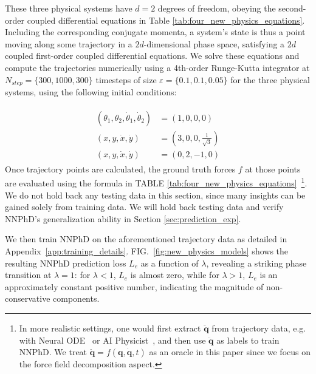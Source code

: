 \documentclass[aps,pre,reprint,superscriptaddress,nofootinbib,amsmath,amssymb]{revtex4-2}
\newcommand{\mat}[1]{\mathbf{#1}}
\newcommand{\q}{\mat{q}}
\newcommand{\qd}{\dot{\mat{q}}}
\newcommand{\qdd}{\ddot{\mat{q}}}
\begin{document}
These three physical systems have $d=2$ degrees of freedom, obeying the second-order coupled differential equations 
in Table \ref{tab:four_new_physics_equations}.
Including the corresponding conjugate momenta, a system's state is thus a point moving along some
trajectory in a $2d$-dimensional phase space, satisfying a $2d$ coupled first-order coupled differential equations. We solve these equations and compute the trajectories numerically using 
a 4th-order Runge-Kutta integrator at $N_{step}=\{300,1000,300%
\}$ timesteps of size $\varepsilon=\{0.1,0.1,0.05%
\}$ for the three physical systems, using the following initial conditions:

\begin{eqnarray}
\begin{aligned}
    (\theta_1,\theta_2,\dot{\theta}_1, \dot{\theta}_2)&=(1,0,0,0)\\
    (x,y,\dot{x},\dot{y})&=(3,0,0,\frac{1}{\sqrt{3}})\\
    (x,y,\dot{x},\dot{y})&=(0,2,-1,0)
\end{aligned}
\end{eqnarray}
Once trajectory points are calculated, the ground truth forces $f$ at those points are evaluated using the formula in TABLE \ref{tab:four_new_physics_equations}~\footnote{In more realistic settings, one would first extract $\qdd$ from trajectory data, e.g. with Neural ODE~\cite{chen2018neural} or AI Physicist~\cite{PhysRevE.100.033311}, and then use $\qdd$ as labels to train NNPhD. We treat $\qdd=f(\q,\qd,t)$ as an oracle in this paper since we focus on the force field decomposition aspect.}. We do not hold back any testing data in this section, since many insights can be gained solely from training data. We will hold back testing data and verify NNPhD's generalization ability in Section \ref{sec:prediction_exp}.

We then train NNPhD on the aforementioned trajectory data  as detailed in Appendix~\ref{app:training_details}.
FIG.~\ref{fig:new_physics_models}  shows the resulting NNPhD prediction loss $L_e$ as a function of $\lambda$, revealing a striking phase transition at $\lambda=1$: for $\lambda<1$, $L_e$ is almost zero, while for $\lambda>1$, $L_e$ is an approximately constant positive number, indicating the magnitude of non-conservative components.%
 
\end{document}
